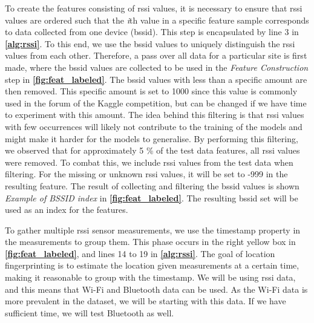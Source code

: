To create the features consisting of \gls{rssi} values, it is necessary to ensure that \gls{rssi} values are ordered such that the \textit{i}th value in a specific feature sample corresponds to data collected from one device (\gls{bssid}). This step is encapsulated by line 3 in \textbf{\autoref{alg:rssi}}. To this end, we use the \gls{bssid} values to uniquely distinguish the \gls{rssi} values from each other. Therefore, a pass over all data for a particular site is first made, where the \gls{bssid} values are collected to be used in the \textit{Feature Construction} step in \textbf{\autoref{fig:feat_labeled}}. The \gls{bssid} values with less than a specific amount are then removed. This specific amount is set to 1000 since this value is commonly used in the forum of the Kaggle competition, but can be changed if we have time to experiment with this amount. The idea behind this filtering is that \gls{rssi} values with few occurrences will likely not contribute to the training of the models and might make it harder for the models to generalise. By performing this filtering, we observed that for approximately 5 \% of the test data features, all \gls{rssi} values were removed. To combat this, we include \gls{rssi} values from the test data when filtering. For the missing or unknown \gls{rssi} values, it will be set to -999 in the resulting feature. The result of collecting and filtering the \gls{bssid} values is shown \textit{Example of BSSID index} in \textbf{\autoref{fig:feat_labeled}}.
The resulting \gls{bssid} set will be used as an index for the features. %

To gather multiple \gls{rssi} sensor measurements, we use the timestamp property in the measurements to group them. This phase occurs in the right yellow box in \textbf{\autoref{fig:feat_labeled}}, and lines 14 to 19 in \textbf{\autoref{alg:rssi}}. The goal of location fingerprinting is to estimate the location given measurements at a certain time, making it reasonable to group with the timestamp. We will be using \gls{rssi} data, and this means that Wi-Fi and Bluetooth data can be used. As the Wi-Fi data is more prevalent in the dataset, we will be starting with this data. If we have sufficient time, we will test Bluetooth as well.

